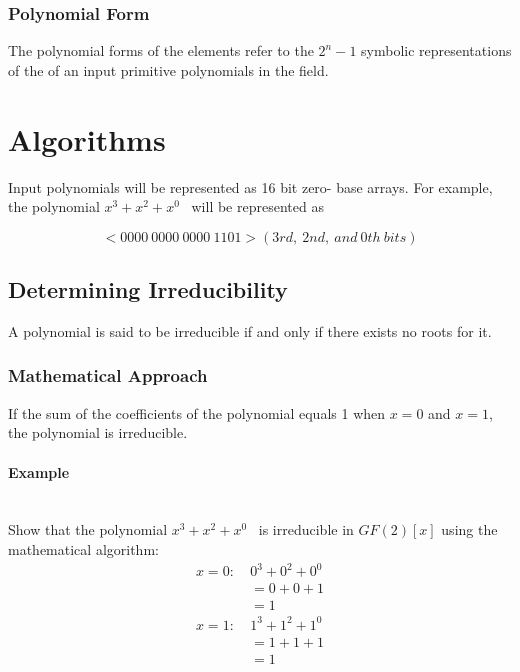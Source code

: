 \documentclass[11pt]{extarticle}
\newcommand{\examplepoly}{$x^{3}+x^{2}+x^{0}$}
\begin{document}
            \subsubsection{Polynomial Form} The polynomial forms of the
            elements refer to the $2^{n}-1$ symbolic representations of the of
            an input primitive polynomials in the field.

        \newpage

    \section{Algorithms} Input polynomials will be represented as 16 bit zero-
    base arrays. For example, the polynomial \examplepoly~ will be represented
    as

        \[ <0000 \ 0000 \ 0000 \ 1101> (3rd, \ 2nd, \ and \ 0th \ bits) \]

        \subsection{Determining Irreducibility} A polynomial is said to be
        irreducible if and only if there exists no roots for it.

            \subsubsection{Mathematical Approach} If the sum of the
            coefficients of the polynomial equals 1 when $x=0$ and $x=1$, the
            polynomial is irreducible.

            \paragraph{Example} \leavevmode \\ Show that the polynomial
            \examplepoly~ is irreducible in $GF(2)[x]$ using the mathematical
            algorithm:
                \begin{equation*}
                    \begin{split}
                        x=0 : \ &  0^{3} + 0^{2} + 0^{0} \\
                        & = 0 + 0 + 1 \\
                        & = 1 \\
                        x=1 : \ &  1^{3} + 1^{2} + 1^{0} \\
                        & = 1 + 1 + 1 \\
                        & = 1 \\
                    \end{split}
                \end{equation*}
\end{document}
